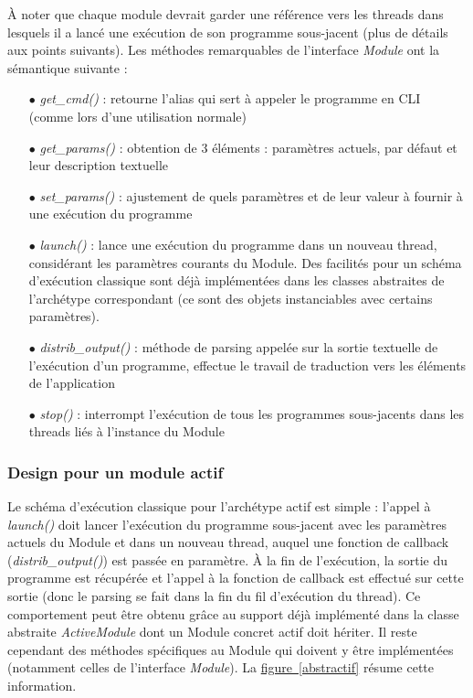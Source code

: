 \documentclass[]{article}
\newcommand{\wordlink}[2]{\hyperref[#1]{#2~\ref{#1}}}
\begin{document}
À noter que chaque module devrait garder une référence vers les threads dans lesquels il a lancé une exécution de son programme sous-jacent (plus de détails aux points suivants).
Les méthodes remarquables de l'interface \textit{Module} ont la sémantique suivante :
\vspace{0.1cm}
\begin{itemize}
\item[$\bullet$] \textit{get\_cmd()} : retourne l'alias qui sert à appeler le programme en CLI (comme lors d'une utilisation normale)
\item[$\bullet$] \textit{get\_params()} : obtention de 3 éléments : paramètres actuels, par défaut et leur description textuelle  
\item[$\bullet$] \textit{set\_params()} : ajustement de quels paramètres et de leur valeur à fournir à une exécution du programme
\vspace{0.2cm}
\item[$\bullet$] \textit{launch()} : lance une exécution du programme dans un nouveau thread, considérant les paramètres courants du Module. Des facilités pour un schéma d'exécution classique sont déjà implémentées dans les classes abstraites de l'archétype correspondant (ce sont des objets instanciables avec certains paramètres).
\vspace{0.1cm}
\item[$\bullet$] \textit{distrib\_output()} : méthode de parsing appelée sur la sortie textuelle de l'exécution d'un programme, effectue le travail de traduction vers les éléments de l'application
\vspace{0.1cm}
\item[$\bullet$] \textit{stop()} : interrompt l'exécution de tous les programmes sous-jacents dans les threads liés à l'instance du Module
\end{itemize}
    
\subsubsection{Design pour un module actif}

Le schéma d'exécution classique pour l'archétype actif est simple : l'appel à \textit{launch()} doit lancer l'exécution du programme sous-jacent avec les paramètres actuels du Module et dans un nouveau thread, auquel une fonction de callback (\textit{distrib\_output()}) est passée en paramètre. À la fin de l'exécution, la sortie du programme est récupérée et l'appel à la fonction de callback est effectué sur cette sortie (donc le parsing se fait dans la fin du fil d'exécution du thread). Ce comportement peut être obtenu grâce au support déjà implémenté dans la classe abstraite \textit{ActiveModule} dont un Module concret actif doit hériter. Il reste cependant des méthodes spécifiques au Module qui doivent y être implémentées (notamment celles de l'interface \textit{Module}). La \wordlink{abstractif}{figure} résume cette information.
\end{document}
